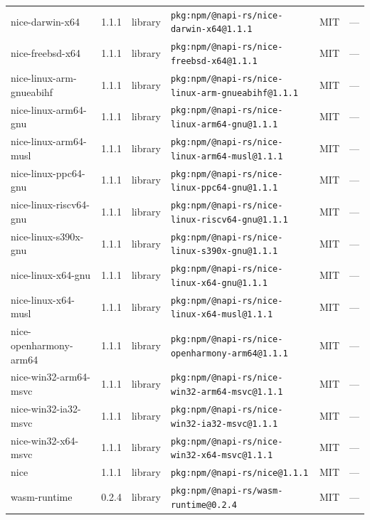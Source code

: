 \documentclass[11pt,a4paper]{article}
\begin{document}
\begin{longtable}{|p{4cm}|p{2cm}|p{1.6cm}|p{5cm}|p{1.5cm}|p{3.5cm}|}
\raggedright nice-darwin-x64 & 1.1.1 & library & \small\texttt{pkg:npm/@napi-rs/nice-darwin-x64@1.1.1} & MIT & \small — \\
\raggedright nice-freebsd-x64 & 1.1.1 & library & \small\texttt{pkg:npm/@napi-rs/nice-freebsd-x64@1.1.1} & MIT & \small — \\
\raggedright nice-linux-arm-gnueabihf & 1.1.1 & library & \small\texttt{pkg:npm/@napi-rs/nice-linux-arm-gnueabihf@1.1.1} & MIT & \small — \\
\raggedright nice-linux-arm64-gnu & 1.1.1 & library & \small\texttt{pkg:npm/@napi-rs/nice-linux-arm64-gnu@1.1.1} & MIT & \small — \\
\raggedright nice-linux-arm64-musl & 1.1.1 & library & \small\texttt{pkg:npm/@napi-rs/nice-linux-arm64-musl@1.1.1} & MIT & \small — \\
\raggedright nice-linux-ppc64-gnu & 1.1.1 & library & \small\texttt{pkg:npm/@napi-rs/nice-linux-ppc64-gnu@1.1.1} & MIT & \small — \\
\raggedright nice-linux-riscv64-gnu & 1.1.1 & library & \small\texttt{pkg:npm/@napi-rs/nice-linux-riscv64-gnu@1.1.1} & MIT & \small — \\
\raggedright nice-linux-s390x-gnu & 1.1.1 & library & \small\texttt{pkg:npm/@napi-rs/nice-linux-s390x-gnu@1.1.1} & MIT & \small — \\
\raggedright nice-linux-x64-gnu & 1.1.1 & library & \small\texttt{pkg:npm/@napi-rs/nice-linux-x64-gnu@1.1.1} & MIT & \small — \\
\raggedright nice-linux-x64-musl & 1.1.1 & library & \small\texttt{pkg:npm/@napi-rs/nice-linux-x64-musl@1.1.1} & MIT & \small — \\
\raggedright nice-openharmony-arm64 & 1.1.1 & library & \small\texttt{pkg:npm/@napi-rs/nice-openharmony-arm64@1.1.1} & MIT & \small — \\
\raggedright nice-win32-arm64-msvc & 1.1.1 & library & \small\texttt{pkg:npm/@napi-rs/nice-win32-arm64-msvc@1.1.1} & MIT & \small — \\
\raggedright nice-win32-ia32-msvc & 1.1.1 & library & \small\texttt{pkg:npm/@napi-rs/nice-win32-ia32-msvc@1.1.1} & MIT & \small — \\
\raggedright nice-win32-x64-msvc & 1.1.1 & library & \small\texttt{pkg:npm/@napi-rs/nice-win32-x64-msvc@1.1.1} & MIT & \small — \\
\raggedright nice & 1.1.1 & library & \small\texttt{pkg:npm/@napi-rs/nice@1.1.1} & MIT & \small — \\
\raggedright wasm-runtime & 0.2.4 & library & \small\texttt{pkg:npm/@napi-rs/wasm-runtime@0.2.4} & MIT & \small — \\

\end{longtable}
\end{document}

